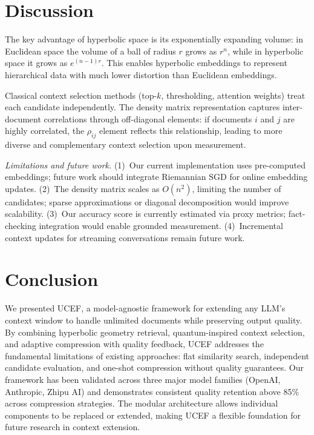 \documentclass[11pt,a4paper]{article}
\newcommand{\ucef}{\textsf{UCEF}}
\begin{document}
\section{Discussion}
\label{sec:discussion}

The key advantage of hyperbolic space is its exponentially expanding
volume: in Euclidean space the volume of a ball of radius $r$ grows as
$r^{n}$, while in hyperbolic space it grows as $e^{(n-1)r}$.  This enables
hyperbolic embeddings to represent hierarchical data with much lower
distortion than Euclidean embeddings.

Classical context selection methods (top-$k$, thresholding, attention
weights) treat each candidate independently.  The density matrix
representation captures inter-document correlations through off-diagonal
elements: if documents $i$ and $j$ are highly correlated, the $\rho_{ij}$
element reflects this relationship, leading to more diverse and
complementary context selection upon measurement.

\emph{Limitations and future work.}
(1)~Our current implementation uses pre-computed embeddings; future work
should integrate Riemannian SGD for online embedding updates.
(2)~The density matrix scales as $O(n^{2})$, limiting the number of
candidates; sparse approximations or diagonal decomposition would improve
scalability.
(3)~Our accuracy score is currently estimated via proxy metrics;
fact-checking integration would enable grounded measurement.
(4)~Incremental context updates for streaming conversations remain future
work.


\section{Conclusion}
\label{sec:conclusion}

We presented \ucef{}, a model-agnostic framework for extending any LLM's
context window to handle unlimited documents while preserving output quality.
By combining hyperbolic geometry retrieval, quantum-inspired context
selection, and adaptive compression with quality feedback, \ucef{} addresses
the fundamental limitations of existing approaches: flat similarity search,
independent candidate evaluation, and one-shot compression without quality
guarantees.  Our framework has been validated across three major model
families (OpenAI, Anthropic, Zhipu AI) and demonstrates consistent quality
retention above 85\% across compression strategies.  The modular
architecture allows individual components to be replaced or extended, making
\ucef{} a flexible foundation for future research in context extension.
\end{document}
